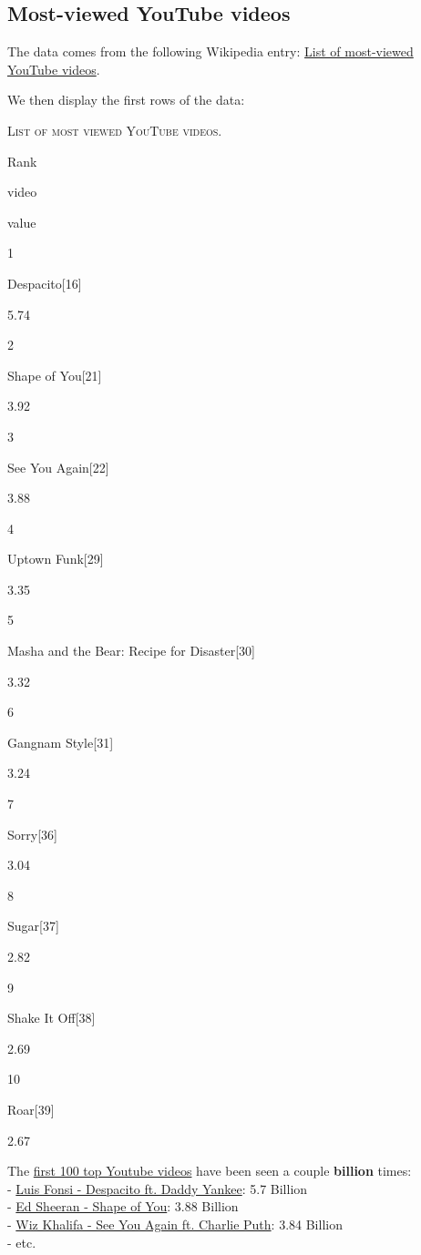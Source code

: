 \documentclass[]{book}
\theoremstyle{definition}
\theoremstyle{definition}
\theoremstyle{definition}
\theoremstyle{remark}
\begin{document}
\subsection{Most-viewed YouTube
videos}\label{most-viewed-youtube-videos}

The data comes from the following Wikipedia entry:
\href{https://en.wikipedia.org/wiki/List_of_most-viewed_YouTube_videos}{List
of most-viewed YouTube videos}.



We then display the first rows of the data:

\label{tab:most-viewed-youtube}\textsc{List of most viewed YouTube videos.}

Rank

video

value

1

Despacito{[}16{]}

5.74

2

Shape of You{[}21{]}

3.92

3

See You Again{[}22{]}

3.88

4

Uptown Funk{[}29{]}

3.35

5

Masha and the Bear: Recipe for Disaster{[}30{]}

3.32

6

Gangnam Style{[}31{]}

3.24

7

Sorry{[}36{]}

3.04

8

Sugar{[}37{]}

2.82

9

Shake It Off{[}38{]}

2.69

10

Roar{[}39{]}

2.67

The
\href{https://www.youtube.com/watch?v=kJQP7kiw5Fk\&list=PLirAqAtl_h2r5g8xGajEwdXd3x1sZh8hC}{first
100 top Youtube videos} have been seen a couple \textbf{billion}
times:\\
-
\href{https://www.youtube.com/watch?v=kJQP7kiw5Fk\&list=PLirAqAtl_h2r5g8xGajEwdXd3x1sZh8hC}{Luis
Fonsi - Despacito ft. Daddy Yankee}: 5.7 Billion\\
-
\href{https://www.youtube.com/watch?v=JGwWNGJdvx8\&list=PLirAqAtl_h2r5g8xGajEwdXd3x1sZh8hC\&index=2}{Ed
Sheeran - Shape of You}: 3.88 Billion\\
-
\href{https://www.youtube.com/watch?v=RgKAFK5djSk\&list=PLirAqAtl_h2r5g8xGajEwdXd3x1sZh8hC\&index=3}{Wiz
Khalifa - See You Again ft. Charlie Puth}: 3.84 Billion\\
- etc.
\end{document}
